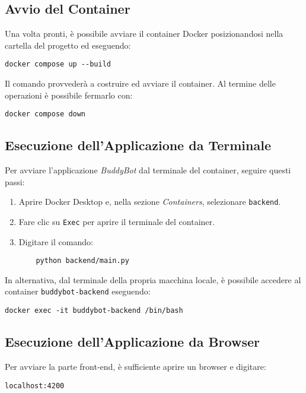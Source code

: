 \subsection{Avvio del Container}
Una volta pronti, è possibile avviare il container Docker posizionandosi nella cartella del progetto ed eseguendo:
\begin{verbatim}
docker compose up --build
\end{verbatim}
Il comando provvederà a costruire ed avviare il container. Al termine delle operazioni è possibile fermarlo con:
\begin{verbatim}
docker compose down
\end{verbatim}

\subsection{Esecuzione dell'Applicazione da Terminale}
Per avviare l'applicazione \textit{BuddyBot} dal terminale del container, seguire questi passi:
\begin{enumerate}
    \item Aprire Docker Desktop e, nella sezione \textit{Containers}, selezionare \texttt{backend}.
    \item Fare clic su \texttt{Exec} per aprire il terminale del container.
    \item Digitare il comando:
    \begin{verbatim}
    python backend/main.py
    \end{verbatim}
\end{enumerate}

In alternativa, dal terminale della propria macchina locale, è possibile accedere al container 
\texttt{buddybot-backend} eseguendo:
\begin{verbatim}
docker exec -it buddybot-backend /bin/bash
\end{verbatim}

\subsection{Esecuzione dell'Applicazione da Browser}
Per avviare la parte front-end, è sufficiente aprire un browser e digitare:
\begin{verbatim}
localhost:4200
\end{verbatim}
